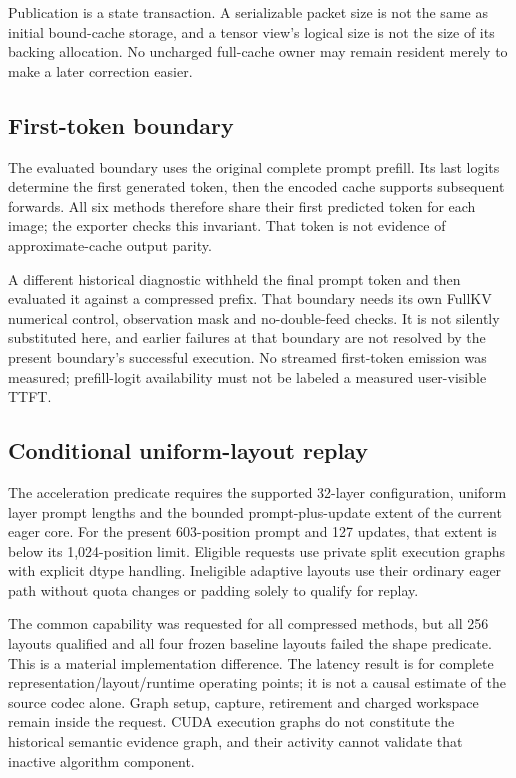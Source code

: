 \documentclass{article}
\begin{document}
Publication is a state transaction. A serializable packet size is not the
same as initial bound-cache storage, and a tensor view's logical size is
not the size of its backing allocation. No uncharged full-cache owner may
remain resident merely to make a later correction easier.

\subsection{First-token boundary}
The evaluated boundary uses the original complete prompt prefill. Its
last logits determine the first generated token, then the encoded cache
supports subsequent forwards. All six methods therefore share their
first predicted token for each image; the exporter checks this invariant.
That token is not evidence of approximate-cache output parity.

A different historical diagnostic withheld the final prompt token and
then evaluated it against a compressed prefix. That boundary needs its
own FullKV numerical control, observation mask and no-double-feed checks.
It is not silently substituted here, and earlier failures at that boundary
are not resolved by the present boundary's successful execution. No
streamed first-token emission was measured; prefill-logit availability
must not be labeled a measured user-visible TTFT.

\subsection{Conditional uniform-layout replay}
The acceleration predicate requires the supported 32-layer configuration,
uniform layer prompt lengths and the bounded prompt-plus-update extent
of the current eager core. For the present 603-position prompt and 127
updates, that extent is below its 1,024-position limit. Eligible requests
use private split execution graphs with explicit dtype handling. Ineligible
adaptive layouts use their ordinary eager path without quota changes or
padding solely to qualify for replay.

The common capability was requested for all compressed methods, but all
256 \Evi{} layouts qualified and all four frozen baseline layouts failed
the shape predicate. This is a material implementation difference. The
latency result is for complete representation/layout/runtime operating
points; it is not a causal estimate of the source codec alone. Graph setup,
capture, retirement and charged workspace remain inside the request.
CUDA execution graphs do not constitute the historical semantic evidence
graph, and their activity cannot validate that inactive algorithm component.
\end{document}

